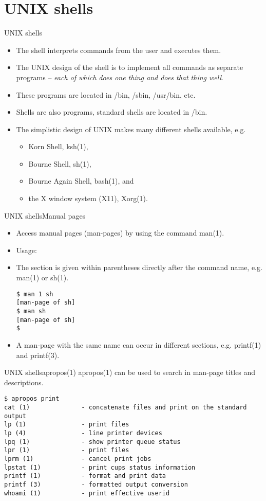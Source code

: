 \documentclass[handout]{beamer}
\begin{document}
\section{UNIX shells}
\begin{frame}{UNIX shells}
	\begin{itemize}
		\item<1> The shell interprets commands from the user and executes them.
		\item<2> The UNIX design of the shell is to implement all commands as 
			separate programs -- \emph{each of which does one thing and does that 
			thing well}.
		\item<3> These programs are located in /bin, /sbin, /usr/bin, etc.
		\item<4> Shells are also programs, standard shells are located in /bin.
		\item<5> The simplistic design of UNIX makes many different shells 
			available, e.g.
			\begin{itemize}
				\item Korn Shell, ksh(1),
				\item Bourne Shell, sh(1),
				\item Bourne Again Shell, bash(1), and
				\item the X window system (X11), Xorg(1).
			\end{itemize}
	\end{itemize}
\end{frame}
\begin{frame}[fragile]{UNIX shells}{Manual pages}
	\begin{itemize}
		\item<1-2> Access manual pages (man-pages) by using the command man(1).
		\item<2> Usage: 
		\item<3> The section is given within parentheses directly after the command 
			name, e.g. man(1) or sh(1).
			\begin{lstlisting}
$ man 1 sh
[man-page of sh]
$ man sh
[man-page of sh]
$
			\end{lstlisting}
		\item<4> A man-page with the same name can occur in different sections, 
			e.g. printf(1) and printf(3).
	\end{itemize}
\end{frame}
\begin{frame}[fragile]{UNIX shells}{apropos(1)}
	apropos(1) can be used to search in man-page titles and descriptions.
	\small
	\begin{lstlisting}
$ apropos print
cat (1)              - concatenate files and print on the standard output
lp (1)               - print files
lp (4)               - line printer devices
lpq (1)              - show printer queue status
lpr (1)              - print files
lprm (1)             - cancel print jobs
lpstat (1)           - print cups status information
printf (1)           - format and print data
printf (3)           - formatted output conversion
whoami (1)           - print effective userid
	\end{lstlisting}
\end{frame}
\end{document}
